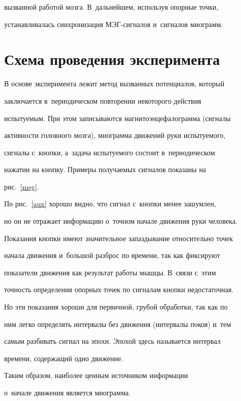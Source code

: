 вызванной работой мозга. В~дальнейшем, используя опорные точки,

устанавливалась синхронизация МЭГ-сигналов и~сигналов миограмм.



\section{Схема проведения эксперимента}



В основе эксперимента лежит метод вызванных потенциалов, который

заключается в~периодическом повторении некоторого действия

испытуемым. При этом записываются магнитоэнцефалограмма (сигналы

активности головного мозга), миограмма движений руки испытуемого,

сигналы с~кнопки, а~задача испытуемого состоит в~периодическом

нажатии на кнопку. Примеры получаемых сигналов показаны на

рис.~\ref{meg}.





По рис.~\ref{aux} хорошо видно, что сигнал с~кнопки менее зашумлен,

но он не отражает информацию о~точном начале движения руки человека.

Показания кнопки имеют значительное запаздывание относительно точек

начала движения и~большой разброс по времени, так как фиксируют

показатели движения как результат работы мышцы. В~связи с~этим

точность определения опорных точек по сигналам кнопки недостаточная.

Но эти показания хороши для первичной, грубой обработки, так как по

ним легко определять интервалы без движения (интервалы покоя) и~тем

самым разбивать сигнал на эпохи. Эпохой здесь называется интервал

времени, содержащий одно движение.



Таким образом, наиболее ценным источником информации 

о~начале движения является миограмма.



